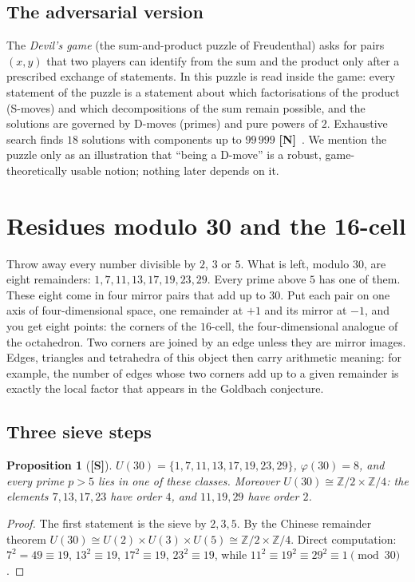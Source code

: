 \documentclass[11pt,a4paper]{article}
\newcommand{\statS}{\textsf{\textbf{[S]}}}
\newcommand{\statN}{\textsf{\textbf{[N]}}}
\theoremstyle{plain}
\newtheorem{proposition}[theorem]{Proposition}
\theoremstyle{definition}
\theoremstyle{remark}
\newcommand{\Z}{\mathbb{Z}}
\begin{document}
\subsection{The adversarial version}
The \emph{Devil's game} (the sum-and-product puzzle of Freudenthal) asks for
pairs $(x,y)$ that two players can identify from the sum and the product only
after a prescribed exchange of statements. In \cite{K-devil} this puzzle is
read inside the game: every statement of the puzzle is a statement about which
factorisations of the product (S-moves) and which decompositions of the sum
remain possible, and the solutions are governed by D-moves (primes) and pure
powers of $2$. Exhaustive search finds $18$ solutions with components up to
$99\,999$ \statN\ \cite{K-devil}. We mention the puzzle only as an illustration
that ``being a D-move'' is a robust, game-theoretically usable notion; nothing
later depends on it.

\section{Residues modulo 30 and the 16-cell}\label{sec:16cell}

\begin{plainwords}
Throw away every number divisible by $2$, $3$ or $5$. What is left, modulo
$30$, are eight remainders: $1,7,11,13,17,19,23,29$. Every prime above $5$ has
one of them. These eight come in four mirror pairs that add up to $30$. Put
each pair on one axis of four-dimensional space, one remainder at $+1$ and its
mirror at $-1$, and you get eight points: the corners of the $16$-cell, the
four-dimensional analogue of the octahedron. Two corners are joined by an edge
unless they are mirror images. Edges, triangles and tetrahedra of this object
then carry arithmetic meaning: for example, the number of edges whose two
corners add up to a given remainder is exactly the local factor that appears
in the Goldbach conjecture.
\end{plainwords}

\subsection{Three sieve steps}
\begin{proposition}[\statS]
$U(30)=\{1,7,11,13,17,19,23,29\}$, $\varphi(30)=8$, and every prime $p>5$
lies in one of these classes. Moreover $U(30)\cong\Z/2\times\Z/4$: the
elements $7,13,17,23$ have order $4$, and $11,19,29$ have order $2$.
\end{proposition}
\begin{proof}
The first statement is the sieve by $2,3,5$. By the Chinese remainder theorem
$U(30)\cong U(2)\times U(3)\times U(5)\cong\Z/2\times\Z/4$. Direct computation:
$7^2=49\equiv19$, $13^2\equiv19$, $17^2\equiv19$, $23^2\equiv19$, while
$11^2\equiv19^2\equiv29^2\equiv1\pmod{30}$.
\end{proof}
\end{document}
